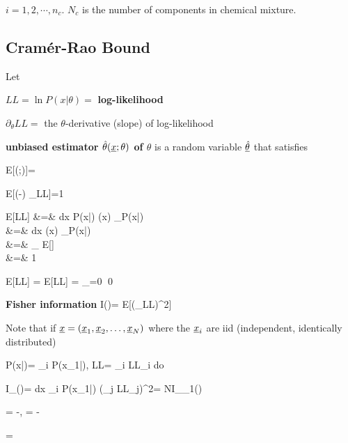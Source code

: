 $i=1, 2, \cdots, n_c$. $N_c$ is 
the number of components in chemical mixture.

\subsection{Cram\'{e}r-Rao Bound}


Let

$LL= \ln P(x|\theta)=$ {\bf log-likelihood}

 $\partial_\theta LL=$
the $\theta$-derivative (slope) of log-likelihood

{\bf unbiased estimator $\htheta(\rvx;\theta)$
of $\theta$} is a random variable
$\ul{\htheta}$ that satisfies

\beq
E[\hat{\theta}(\rvx;\theta)]=\theta
\eeq

\begin{claim}

\beq
E[(\rv{\htheta}-\theta)
\partial_\theta LL]=1
\eeq


\end{claim}
\proof

\beqa
E[\ul{\htheta}LL]
&=&
\int dx\; P(x|\theta)
 \htheta(x)
\partial_\theta \ln P(x|\theta)
\\
&=&
\int dx\; \htheta(x)
\partial_\theta P(x|\theta)
\\
&=&
\partial_\theta
E[\ul{\htheta}]
\\
&=&
1
\eeqa

\beq
E[\theta LL]
=
\theta E[LL]
=
\theta\partial_=0
\eeq
\qed

{\bf Fisher information}
\beq
I(\theta)=
E[(\partial_\theta LL)^2]
\eeq

Note that if $\rvx = (\rvx_1, \rvx_2, \ldots, \rvx_N)$ 
where the $\rvx_i$ are iid (independent, identically distributed)

\beq
P(x|\theta)=
\prod_i P(x_1|\theta),
\quad
LL= \sum_i LL_i
\eeq
do

\beq
I_\rvx(\theta)=
\int dx\;
\prod_i P(x_1|\theta)
(\sum_j LL_j)^2=
NI_{\rvx_1}(\theta)
\eeq

\begin{claim}

\beq
\av{\rv{\htheta}, \rv{\htheta}} \geq 
{}
\eeq

\end{claim}
\proof

\beq
\Delta \rva =
\rva -\av{\rva},
\;
\Delta \rvb =
\rvb -\av{\rvb}
\eeq

\beq
\av{\rva, \rvb}=
\av{\Delta \rva, \Delta \rvb}
\eeq

